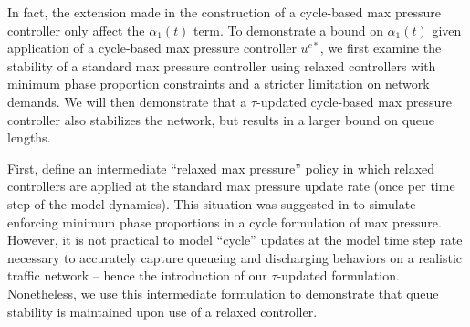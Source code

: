 In fact, the extension made in the construction of a cycle-based max pressure controller only affect the $\alpha_1 (t)$ term. To demonstrate a bound on $\alpha_1(t)$ given application of a cycle-based max pressure controller $u^{c*}$, we first examine the stability of a standard max pressure controller using relaxed controllers with minimum phase proportion constraints and a stricter limitation on network demands. We will then demonstrate that a $\tau$-updated cycle-based max pressure controller also stabilizes the network, but results in a larger bound on queue lengths. 


First, define an intermediate ``relaxed max pressure'' policy in which relaxed controllers are applied at the standard max pressure update rate (once per time step of the model dynamics). 
This situation was suggested in \cite{MaxPressureStochastic} to simulate enforcing minimum phase proportions in a cycle formulation of max pressure. However, it is not practical to model ``cycle'' updates at the model time step rate necessary to accurately capture queueing and discharging behaviors on a realistic traffic network -- hence the introduction of our $\tau$-updated formulation. Nonetheless, we use this intermediate formulation to demonstrate that queue stability is maintained upon use of a relaxed controller. 

